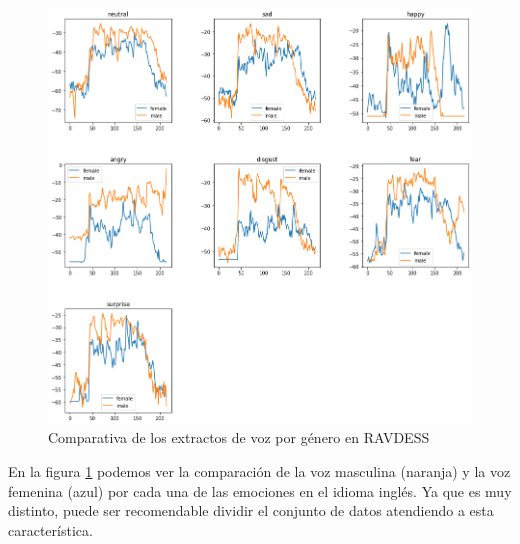 \documentclass[11pt,a4paper,spanish]{book}
\begin{document}
	\begin{figure}[H]
		\centering
		\includegraphics[scale=0.35]{comparative_waveform.png} 
		\caption{Comparativa de los extractos de voz por género en RAVDESS}
		\label{fig:comp_emociones_genero}
	\end{figure}
	En la figura \ref{fig:comp_emociones_genero} podemos ver la comparación de la voz masculina (naranja) y la voz femenina (azul) por cada una de las emociones en el idioma inglés. Ya que es muy distinto, puede ser recomendable dividir el conjunto de datos atendiendo a esta característica.
	
	
\end{document}
